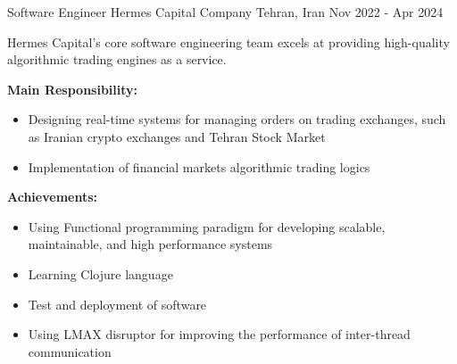 \begin{cventries}
  \cventry
  {Software Engineer} %
  {Hermes Capital Company} %
  {Tehran, Iran} %
  {Nov 2022 - Apr 2024} %
  {
    \begin{cvitems} %
      \item {Hermes Capital's core software engineering team excels at providing high-quality algorithmic trading engines as a service.}
      \item {\textbf{Main Responsibility:}
            \begin{itemize}[label=-]
                \item Designing real-time systems for managing orders on trading exchanges, such as Iranian crypto exchanges and Tehran Stock Market
                \item Implementation of financial markets algorithmic trading logics
            \end{itemize}
            }
      \item {\textbf{Achievements:}
            \begin{itemize}[label=-]
                \item Using Functional programming paradigm for developing scalable, maintainable, and high performance systems
                \item Learning Clojure language
                \item Test and deployment of software
                \item Using LMAX disruptor for improving the performance of inter-thread communication
            \end{itemize}
            }
    \end{cvitems}
  }


\end{cventries}
